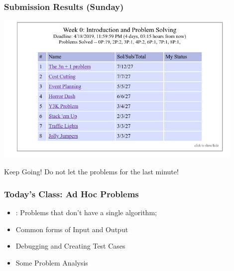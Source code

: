 \documentclass{beamer}
\begin{document}
%


\begin{frame}
  \frametitle{Submission Results (Sunday)}

  \begin{center}
    \includegraphics[width=0.9\textwidth]{img/resultsW0}
  \end{center}

  \begin{block}{}
    Keep Going! Do not let the problems for the last minute!
  \end{block}

\end{frame}

\begin{frame}
  \frametitle{Today's Class: Ad Hoc Problems}

  \begin{itemize}
  \item {}: Problems that don't have a single algorithm;
  \bigskip

  \item Common forms of Input and Output
  \bigskip

  \item Debugging and Creating Test Cases
  \bigskip

  \item Some Problem Analysis
  \end{itemize}

\end{frame}
\end{document}
